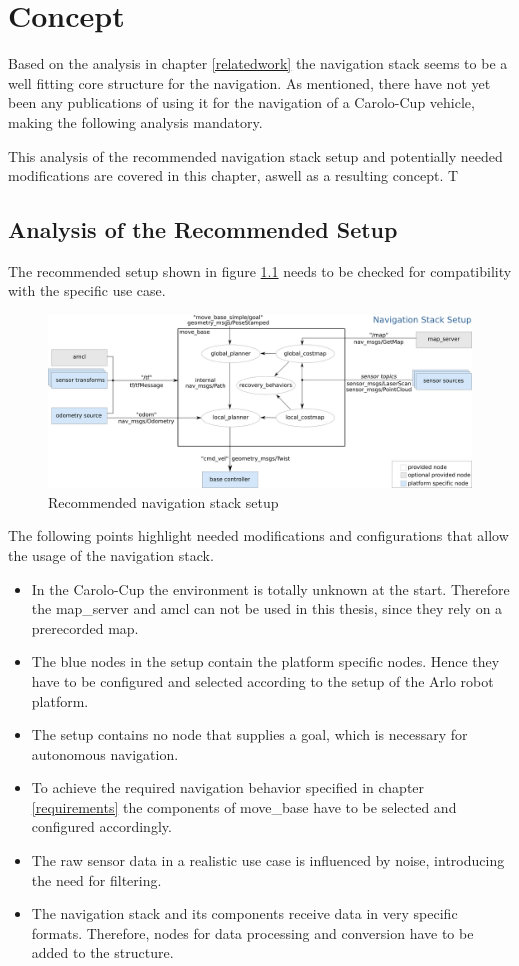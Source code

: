 \chapter{Concept}
\label{Concept}


Based on the analysis in chapter \ref{relatedwork} the navigation stack seems to be a well fitting core structure for the navigation. As mentioned, there have not yet been any publications of using it for the navigation of a Carolo-Cup vehicle, making the following analysis mandatory. 

This analysis of the recommended navigation stack setup and potentially needed modifications are covered in this chapter, aswell as a resulting concept.
T
\section{Analysis of the Recommended Setup}
The recommended setup shown in figure \ref{recnavsetup} needs to be checked for compatibility with the specific use case.

\begin{figure}[H]
	\includegraphics[width=\textwidth]{Pictures/navigation stack setup}
	\caption{Recommended navigation stack setup}
	\label{recnavsetup}
\end{figure}

The following points highlight needed modifications and configurations that allow the usage of the navigation stack.

\begin{itemize}
	\item In the Carolo-Cup the environment is totally unknown at the start. Therefore the map\_server and amcl can not be used in this thesis, since they rely on a prerecorded map.
	\item The blue nodes in the setup contain the platform specific nodes. Hence they have to be configured and selected according to the setup of the Arlo robot platform.
	\item The setup contains no node that supplies a goal, which is necessary for autonomous navigation.
	\item To achieve the required navigation behavior specified in chapter \ref{requirements} the components of move\_base have to be selected and configured accordingly.
	\item The raw sensor data in a realistic use case is influenced by noise, introducing the need for filtering.
	\item The navigation stack and its components receive data in very specific formats. Therefore, nodes for data processing and conversion have to be added to the structure.
\end{itemize}

